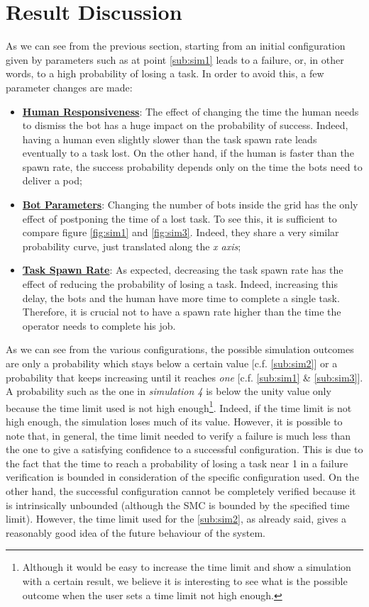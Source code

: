 \documentclass{article}
\begin{document}
	\section{Result Discussion}
			As we can see from the previous section, starting from an initial configuration given by parameters such as at point \ref{sub:sim1} leads to a failure, or, in other words, to a high probability of losing a task. In order to avoid this, a few parameter changes are made:
			\begin{itemize}
				\item {\textbf{\underline{Human Responsiveness}}: The effect of changing the time the human needs to dismiss the bot has a huge impact on the probability of success. Indeed, having a human even slightly slower than the task spawn rate leads eventually to a task lost. On the other hand, if the human is faster than the spawn rate, the success probability depends only on the time the bots need to deliver a pod};
				\item {\textbf{\underline{Bot Parameters}}: Changing the number of bots inside the grid has the only effect of postponing the time of a lost task. To see this, it is sufficient to compare figure \ref{fig:sim1} and \ref{fig:sim3}. Indeed, they share a very similar probability curve, just translated along the \emph{x axis}};
				\item {\textbf{\underline{Task Spawn Rate}}:} As expected, decreasing the task spawn rate has the effect of reducing the probability of losing a task. Indeed, increasing this delay, the bots and the human have more time to complete a single task. Therefore, it is crucial not to have a spawn rate higher than the time the operator needs to complete his job.
			\end{itemize}
			As we can see from the various configurations, the possible simulation outcomes are only a probability which stays below a certain value [c.f. \ref{sub:sim2}] or a probability that keeps increasing until it reaches \emph{one} [c.f. \ref{sub:sim1} \& \ref{sub:sim3}]. A probability such as the one in \emph{simulation 4} is below the unity value only because the time limit used is not high enough\footnote{Although it would be easy to increase the time limit and show a simulation with a certain result, we believe it is interesting to see what is the possible outcome when the user sets a time limit not high enough.}.
			Indeed, if the time limit is not high enough, the simulation loses much of its value. However, it is possible to note that, in general, the time limit needed to verify a failure is much less than the one to give a satisfying confidence to a successful configuration. This is due to the fact that the time to reach a probability of losing a task near 1 in a failure verification is bounded in consideration of the specific configuration used. On the other hand, the successful configuration cannot be completely verified because it is intrinsically unbounded (although the SMC is bounded by the specified time limit). However, the time limit used for the \ref{sub:sim2}, as already said, gives a reasonably good idea of the future behaviour of the system.
			
\end{document}
